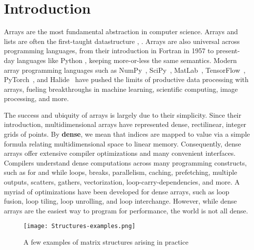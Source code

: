 
\section{Introduction}

Arrays are the most fundamental abstraction in computer science. Arrays and lists are often the first-taught datastructure
\cite[Chapter 2.2]{abelson_structure_1996}, \cite[Chapter 2.2]{knuth_art_1997}.
%
Arrays are also universal across programming languages, from their introduction
in Fortran in 1957 to present-day languages like Python
\cite{backus_fortran_1957}, keeping more-or-less the same semantics.
%
Modern array programming languages such as NumPy~\cite{harris_array_2020},
SciPy~\cite{virtanen_scipy_2020}, MatLab~\cite{moler_history_2020},
TensorFlow~\cite{abadi_tensorflow_2016}, PyTorch~\cite{paszke_pytorch_2019}, and
Halide~\cite{ragan-kelley_halide_2013} have pushed the limits of productive data
processing with arrays, fueling breakthroughs in machine learning, scientific
computing, image processing, and more.

The success and ubiquity of arrays is largely due to their simplicity. 
%
Since their introduction, multidimensional arrays have represented dense, rectilinear,
integer grids of points. 
%
By \textbf{dense}, we mean that indices are mapped to value via a simple formula relating multidimensional space to linear memory.
%
Consequently, dense arrays offer extensive compiler optimizations and many convenient interfaces.
%
%
Compilers understand dense computations across many
programming constructs, such as for and while loops, breaks, parallelism,
caching, prefetching, multiple outputs, scatters, gathers, vectorization,
loop-carry-dependencies, and more. A myriad of optimizations have been developed for
dense arrays, such as loop fusion, loop tiling, loop unrolling, and loop
interchange.
%
However, while dense arrays are the easiest way to program for performance, the world is not all dense.

\begin{figure}
	\texttt{[image: Structures-examples.png]}
    \vspace{-12pt}
    \caption{A few examples of matrix structures arising in practice}
    \vspace{-8pt}
\end{figure}

